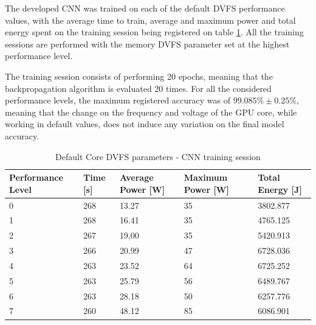 The developed CNN was trained on each of the default DVFS performance values, with the average time to train, average and maximum power and total energy spent on the training session being registered on table \ref{tab:defaultDVFStrain}. All the training sessions are performed with the memory DVFS parameter set at the highest performance level.

The training session consists of performing 20 epochs, meaning that the backpropagation algorithm is evaluated 20 times. For all the considered performance levels, the maximum registered accuracy was of $99.085\% \pm 0.25\% $, meaning that the change on the frequency and voltage of the GPU core, while working in default values, does not induce any variation on the final model accuracy.

\begin{table}[!htb]
\centering
\begin{tabular}{lllll}
\textbf{Performance Level} & \textbf{Time {[}s{]}} & \textbf{Average Power {[}W{]}} & \textbf{Maximum Power {[}W{]}} & \textbf{Total Energy {[}J{]}} \\ \hline
0                          & 268                   & 13.27                          & 35                             & 3802.877                      \\
1                          & 268                   & 16.41                          & 35                             & 4765.125                      \\
2                          & 267                   & 19,00                             & 35                             & 5420.913                      \\
3                          & 266                   & 20.99                          & 47                             & 6728.036                      \\
4                          & 263                   & 23.52                          & 64                             & 6725.252                      \\
5                          & 263                    & 25.79                          & 56                             & 6489.767                      \\
6                          & 263                   & 28.18                          & 50                             & 6257.776                      \\
7                          & 260                   & 48.12                          & 85                             & 6086.901                     
\end{tabular}
\caption{Default Core DVFS parameters - CNN training session}
\label{tab:defaultDVFStrain}
\end{table}

